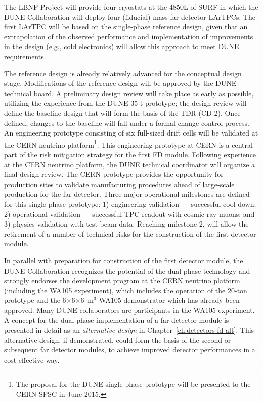 The LBNF Project will provide four cryostats at the 4850L of SURF in
which the DUNE Collaboration will deploy four  (fiducial)
mass far detector LArTPCs.  The first  LArTPC will be based
on the single-phase reference design, given that an extrapolation of
the observed performance and implementation of improvements in the
design (e.g., cold electronics) will allow this approach to meet DUNE
requirements.



The reference design is already relatively advanced for  the 
conceptual design
stage. Modifications of the reference design will
be approved by the DUNE technical board. A preliminary design
review will take place as early as possible, utilizing the experience
from the DUNE 35-t prototype; the design review will define the
baseline design that will form the basis of the TDR (CD-2).  Once
defined, changes to the baseline will fall under a formal
change-control process. An engineering prototype consisting of
six full-sized drift cells will be validated at the CERN neutrino
platform\footnote{The proposal for the DUNE single-phase prototype
  will be presented to the CERN SPSC in June 2015.}.  This engineering
prototype at CERN is a central part of the risk mitigation strategy
for the first  FD module. Following experience at the CERN
neutrino platform, the DUNE technical coordinator will organize a
final design review. The CERN prototype provides the opportunity for
production sites to validate manufacturing procedures ahead of
large-scale production for the far detector. Three major operational
milestones are defined for this single-phase prototype: 1) engineering
validation --- successful cool-down; 2) operational validation ---
successful TPC readout with cosmic-ray muons; and 3) physics
validation with test beam data. Reaching milestone 2, will allow the
retirement of a number of technical risks for the construction of the
first  detector module.

In parallel with preparation for construction of the first 
detector module, the DUNE Collaboration recognizes the potential of
the dual-phase technology and strongly endorses the development
program at the CERN neutrino platform (including the WA105 experiment), which
includes the operation of the 20-ton prototype and the
6$\times$6$\times$6~m$^3$ WA105 demonstrator which has already been
approved. Many DUNE collaborators are participants in the WA105
experiment. A concept for the dual-phase implementation of a far detector module
is presented in detail as an \textit{alternative design} in
Chapter~\ref{ch:detectors-fd-alt}. This alternative design, if
demonstrated, could form the basis of the second or subsequent 
far detector modules, to achieve improved detector performances in a
cost-effective way.

